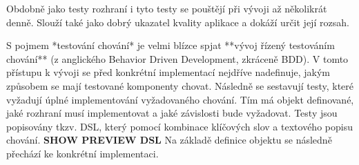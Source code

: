 Obdobně jako testy rozhraní i tyto testy se pouštějí při vývoji až několikrát denně.
Slouží také jako dobrý ukazatel kvality aplikace a dokáží určit její rozsah.


S pojmem *testování chování* je velmi blízce spjat **vývoj řízený testováním chování** (z anglického Behavior Driven Development, zkráceně BDD).
V tomto přístupu k vývoji se před konkrétní implementací nejdříve nadefinuje, jakým způsobem se mají testované komponenty chovat.
Následně se sestavují testy, které vyžadují úplné implementování vyžadovaného chování.
Tím má objekt definované, jaké rozhraní musí implementovat a jaké závislosti bude vyžadovat.
Testy jsou popisovány tkzv. DSL, který pomocí kombinace klíčových slov a textového popisu chování. \textbf{SHOW PREVIEW DSL}
Na základě definice objektu se následně přechází ke konkrétní implementaci. \cite{objcio-bdd}
